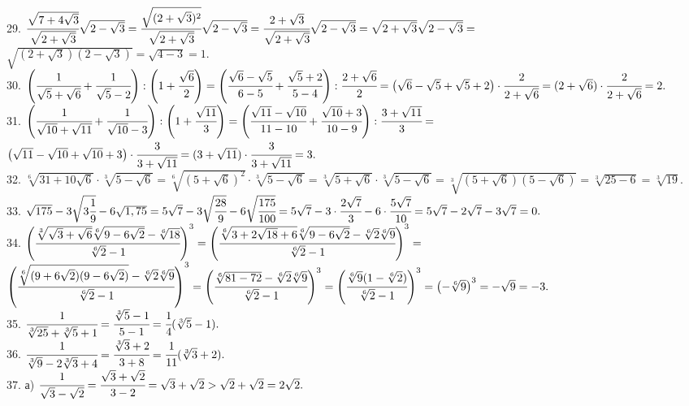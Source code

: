 29. $\cfrac{\sqrt{7+4\sqrt{3}}}{\sqrt{2+\sqrt{3}}}\sqrt{2-\sqrt{3}}=
\cfrac{\sqrt{(2+\sqrt{3})^2}}{\sqrt{2+\sqrt{3}}}\sqrt{2-\sqrt{3}}=
\cfrac{2+\sqrt{3}}{\sqrt{2+\sqrt{3}}}\sqrt{2-\sqrt{3}}=\sqrt{2+\sqrt{3}}\sqrt{2-\sqrt{3}}=$\\$\sqrt{(2+\sqrt{3})(2-\sqrt{3})}=\sqrt{4-3}=1.$\\
30. $\left(\cfrac{1}{\sqrt{5}+\sqrt{6}}+\cfrac{1}{\sqrt{5}-2}\right):\left(1+\cfrac{\sqrt{6}}{2}\right)=
\left(\cfrac{\sqrt{6}-\sqrt{5}}{6-5}+\cfrac{\sqrt{5}+2}{5-4}\right):\cfrac{2+\sqrt{6}}{2}=
\left(\sqrt{6}-\sqrt{5}+\sqrt{5}+2\right)\cdot\cfrac{2}{2+\sqrt{6}}=(2+\sqrt{6})\cdot\cfrac{2}{2+\sqrt{6}}=2.$\\
31. $\left(\cfrac{1}{\sqrt{10}+\sqrt{11}}+\cfrac{1}{\sqrt{10}-3}\right):\left(1+\cfrac{\sqrt{11}}{3}\right)=
\left(\cfrac{\sqrt{11}-\sqrt{10}}{11-10}+\cfrac{\sqrt{10}+3}{10-9}\right):\cfrac{3+\sqrt{11}}{3}=$\\$
\left(\sqrt{11}-\sqrt{10}+\sqrt{10}+3\right)\cdot\cfrac{3}{3+\sqrt{11}}=
(3+\sqrt{11})\cdot\cfrac{3}{3+\sqrt{11}}=3.$\\
32. $\sqrt[6]{31+10\sqrt{6}}\cdot\sqrt[3]{5-\sqrt{6}}=\sqrt[6]{(5+\sqrt{6})^2}\cdot\sqrt[3]{5-\sqrt{6}}=\sqrt[3]{5+\sqrt{6}}\cdot\sqrt[3]{5-\sqrt{6}}=
\sqrt[3]{(5+\sqrt{6})(5-\sqrt{6})}=\sqrt[3]{25-6}=\sqrt[3]{19}.$\\
33. $\sqrt{175}-3\sqrt{3\cfrac{1}{9}}-6\sqrt{1,75}=5\sqrt{7}-3\sqrt{\cfrac{28}{9}}-6\sqrt{\cfrac{175}{100}}=
5\sqrt{7}-3\cdot\cfrac{2\sqrt{7}}{3}-6\cdot\cfrac{5\sqrt{7}}{10}=5\sqrt{7}-2\sqrt{7}-3\sqrt{7}=0.$\\
34. $\left(\cfrac{\sqrt[3]{\sqrt{3}+\sqrt{6}}\sqrt[6]{9-6\sqrt{2}}-\sqrt[6]{18}}{\sqrt[6]{2}-1}\right)^3=
\left(\cfrac{\sqrt[6]{3+2\sqrt{18}+6}\sqrt[6]{9-6\sqrt{2}}-\sqrt[6]{2}\sqrt[6]{9}}{\sqrt[6]{2}-1}\right)^3=$\\$
\left(\cfrac{\sqrt[6]{(9+6\sqrt{2})(9-6\sqrt{2})}-\sqrt[6]{2}\sqrt[6]{9}}{\sqrt[6]{2}-1}\right)^3=
\left(\cfrac{\sqrt[6]{81-72}-\sqrt[6]{2}\sqrt[6]{9}}{\sqrt[6]{2}-1}\right)^3=
\left(\cfrac{\sqrt[6]{9}(1-\sqrt[6]{2})}{\sqrt[6]{2}-1}\right)^3=
\left(-\sqrt[6]{9}\right)^3=-\sqrt{9}=-3.$\\
35. $\cfrac{1}{\sqrt[3]{25}+\sqrt[3]{5}+1}=\cfrac{\sqrt[3]{5}-1}{5-1}=\cfrac{1}{4}(\sqrt[3]{5}-1).$\\
36. $\cfrac{1}{\sqrt[3]{9}-2\sqrt[3]{3}+4}=\cfrac{\sqrt[3]{3}+2}{3+8}=\cfrac{1}{11}(\sqrt[3]{3}+2).$\\
37. а) $\cfrac{1}{\sqrt{3}-\sqrt{2}}=\cfrac{\sqrt{3}+\sqrt{2}}{3-2}=\sqrt{3}+\sqrt{2}>\sqrt{2}+\sqrt{2}=2\sqrt{2}.$\\
